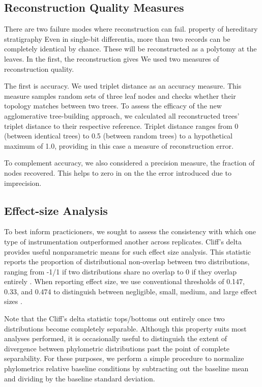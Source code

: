 \subsection{Reconstruction Quality Measures}

There are two failure modes where reconstruction can fail.
property of hereditary stratigraphy
Even in single-bit differentia, more than two records can be completely identical by chance.
These will be reconstructed as a polytomy at the leaves.
In the first, the reconstruction gives
We used two measures of reconstruction quality.

The first is accuracy.
We used triplet distance as an accuracy measure.
This measure samples random sets of three leaf nodes and checks whether their topology matches between two trees.
To assess the efficacy of the new agglomerative tree-building approach, we calculated all reconstructed trees' triplet distance to their respective reference.
Triplet distance ranges from 0 (between identical trees) to 0.5 (between random trees) to a hypothetical maximum of 1.0, providing in this case a measure of reconstruction error.

To complement accuracy, we also considered a precision measure, the fraction of nodes recovered.
This helps to zero in on the the error introduced due to imprecision.

\subsection{Effect-size Analysis}

To best inform practicioners, we sought to assess the consistency with which one type of instrumentation outperformed another across replicates.
Cliff's delta provides useful nonparametric means for such effect size analysis.
This statistic reports the proportion of distributional non-overlap between two distributions, ranging from -1/1 if two distributions share no overlap to 0 if they overlap entirely \citep{meissel2024using,cliff1993dominance}.
When reporting effect size, we use conventional thresholds of 0.147, 0.33, and 0.474 to distinguish between negligible, small, medium, and large effect sizes \citep{hess2004robust}.

Note that the Cliff's delta statistic tops/bottoms out entirely once two distributions become completely separable.
Although this property suits most analyses performed, it is occasionally useful to distinguish the extent of divergence between phylometric distributions past the point of complete separability.
For these purposes, we perform a simple procedure to normalize phylometrics relative baseline conditions by subtracting out the baseline mean and dividing by the baseline standard deviation.

